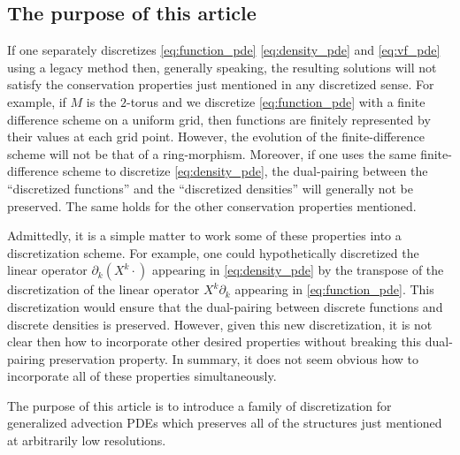 \documentclass[12pt]{amsart}
\begin{document}
\subsection{The purpose of this article}
\label{sec:purpose}
If one separately discretizes \eqref{eq:function_pde} \eqref{eq:density_pde} and \eqref{eq:vf_pde} using a legacy method
then, generally speaking, the resulting solutions will not satisfy the conservation properties just mentioned in any discretized sense.
For example, if $M$ is the $2$-torus and we discretize \eqref{eq:function_pde} with a finite difference scheme on a uniform grid,
then functions are finitely represented by their values at each grid point.
However, the evolution of the finite-difference scheme will not be that of a ring-morphism.
Moreover, if one uses the same finite-difference scheme to discretize \eqref{eq:density_pde}, the dual-pairing between the 
``discretized functions'' and the ``discretized densities'' will generally not be preserved.
The same holds for the other conservation properties mentioned.

Admittedly, it is a simple matter to work some of these properties into a discretization scheme.
For example, one could hypothetically discretized the linear operator  $\partial_k (X^k \cdot )$ appearing in \eqref{eq:density_pde} by the transpose of the
discretization of the linear operator $X^k \partial_k$ appearing in \eqref{eq:function_pde}.
This discretization would ensure that the dual-pairing between discrete functions and discrete densities is preserved.
However, given this new discretization,
it is not clear then how to incorporate other desired properties without breaking this dual-pairing preservation property.
In summary, it does not seem obvious how to incorporate all of these properties simultaneously.

The purpose of this article is to introduce a family of discretization for generalized advection PDEs
which preserves all of the structures just mentioned at arbitrarily low resolutions.

\end{document}
